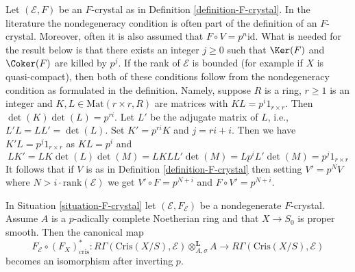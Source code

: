 \begin{remark}
\label{remark-F-crystal-variants}
Let $(\mathcal{E}, F)$ be an $F$-crystal as in
Definition \ref{definition-F-crystal}.
In the literature the nondegeneracy condition is often part of the
definition of an $F$-crystal. Moreover, often it is also assumed that
$F \circ V = p^n\text{id}$. What is needed for the result below is
that there exists an integer $j \geq 0$ such that $\Ker(F)$ and
$\Coker(F)$ are killed by $p^j$. If the rank of $\mathcal{E}$
is bounded (for example if $X$ is quasi-compact), then both of these
conditions follow from the nondegeneracy condition as formulated in
the definition. Namely, suppose $R$ is a ring, $r \geq 1$ is an integer and
$K, L \in \text{Mat}(r \times r, R)$ are matrices with
$K L = p^i 1_{r \times r}$. Then $\det(K)\det(L) = p^{ri}$. 
Let $L'$ be the adjugate matrix of $L$, i.e.,
$L' L = L L' = \det(L)$. Set $K' = p^{ri} K$ and $j = ri + i$.
Then we have $K' L = p^j 1_{r \times r}$ as $K L = p^i$ and
$$
L K' = L K \det(L) \det(M) = L K L L' \det(M) = L p^i L' \det(M) =
p^j 1_{r \times r}
$$
It follows that if $V$ is as in Definition \ref{definition-F-crystal}
then setting $V' = p^N V$ where $N > i \cdot \text{rank}(\mathcal{E})$
we get $V' \circ F = p^{N + i}$ and $F \circ V' = p^{N + i}$.
\end{remark}

\begin{theorem}
\label{theorem-cohomology-F-crystal}
In Situation \ref{situation-F-crystal} let $(\mathcal{E}, F_\mathcal{E})$
be a nondegenerate $F$-crystal. Assume $A$ is a $p$-adically complete
Noetherian ring and that $X \to S_0$ is proper smooth. Then
the canonical map
$$
F_\mathcal{E} \circ (F_X)_{\text{cris}}^* :
R\Gamma(\text{Cris}(X/S), \mathcal{E}) \otimes^\mathbf{L}_{A, \sigma} A
\longrightarrow
R\Gamma(\text{Cris}(X/S), \mathcal{E})
$$
becomes an isomorphism after inverting $p$.
\end{theorem}

